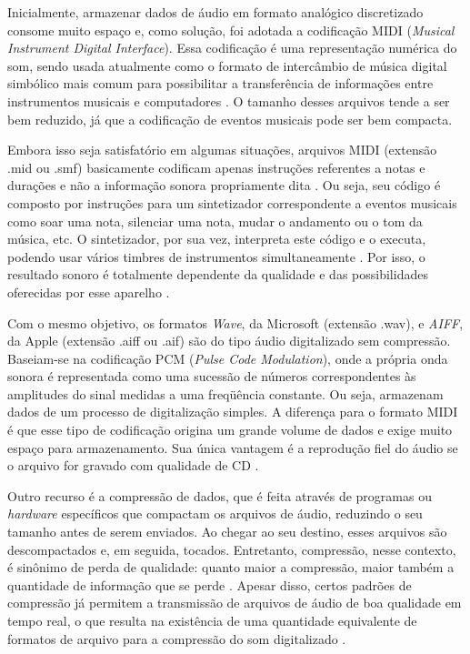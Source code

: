 Inicialmente, armazenar dados de áudio em formato analógico discretizado consome muito espaço \cite{juliana2004} e, como solução, foi adotada a codificação MIDI (\textit{Musical Instrument Digital Interface}). Essa codificação é uma representação numérica do som, sendo usada atualmente como o formato de intercâmbio de música digital simbólico mais comum para possibilitar a transferência de informações entre instrumentos musicais e computadores \cite{muller2007}. O tamanho desses arquivos tende a ser bem reduzido, já que a codificação de eventos musicais pode ser bem compacta.

Embora isso seja satisfatório em algumas situações, arquivos MIDI (extensão .mid ou .smf) basicamente codificam apenas instruções referentes a notas e durações e não a informação sonora propriamente dita \cite{fernando&kon1998}. Ou seja, seu código é composto por instruções para um sintetizador correspondente a eventos musicais como soar uma nota, silenciar uma nota, mudar o andamento ou o tom da música, etc. O sintetizador, por sua vez, interpreta este código e o executa, podendo usar vários timbres de instrumentos simultaneamente \cite{miletto2004}. Por isso, o resultado sonoro é totalmente dependente da qualidade e das possibilidades oferecidas por esse aparelho \cite{fernando&kon1998}.

Com o mesmo objetivo, os formatos \textit{Wave}, da Microsoft (extensão .wav), e \textit{AIFF}, da Apple (extensão .aiff ou .aif) são do tipo áudio digitalizado sem compressão. Baseiam-se na codificação PCM (\textit{Pulse Code Modulation}), onde a própria onda sonora é representada como uma sucessão de números correspondentes às amplitudes do sinal medidas a uma freqüência constante. Ou seja, armazenam dados de um processo de digitalização simples. A diferença para o formato MIDI é que esse tipo de codificação origina um grande volume de dados e exige muito espaço para armazenamento. Sua única vantagem é a reprodução fiel do áudio se o arquivo for gravado com qualidade de CD \cite{miletto2004}.

Outro recurso é a compressão de dados, que é feita através de programas ou \textit{hardware} específicos que compactam os arquivos de áudio, reduzindo o seu tamanho antes de serem enviados. Ao chegar ao seu destino, esses arquivos são descompactados e, em seguida, tocados. Entretanto, compressão, nesse contexto, é sinônimo de perda de qualidade: quanto maior a compressão, maior também a quantidade de informação que se perde \cite{fernando&kon1998}. Apesar disso, certos padrões de compressão já permitem a transmissão de arquivos de áudio de boa qualidade em tempo real, o que resulta na existência de uma quantidade equivalente de formatos de arquivo para a compressão do som digitalizado \cite{miletto2004}.


